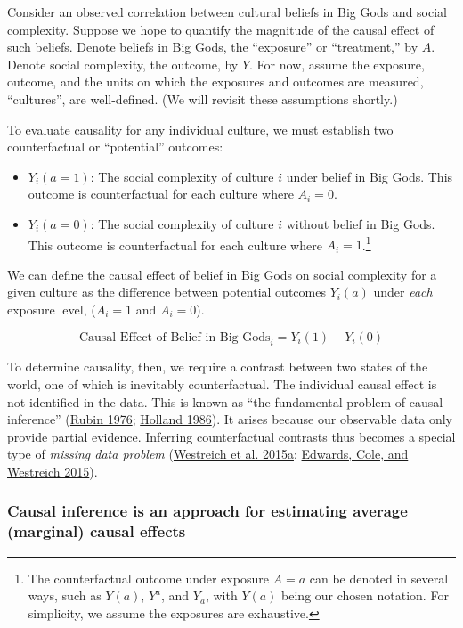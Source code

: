 \documentclass[
  singlecolumn]{report}
\providecommand{\tightlist}{%
  \setlength{\itemsep}{0pt}\setlength{\parskip}{0pt}}\usepackage{longtable,booktabs,array}
\begin{document}
Consider an observed correlation between cultural beliefs in Big Gods
and social complexity. Suppose we hope to quantify the magnitude of the
causal effect of such beliefs. Denote beliefs in Big Gods, the
``exposure'' or ``treatment,'' by \(A\). Denote social complexity, the
outcome, by \(Y\). For now, assume the exposure, outcome, and the units
on which the exposures and outcomes are measured, ``cultures'', are
well-defined. (We will revisit these assumptions shortly.)

To evaluate causality for any individual culture, we must establish two
counterfactual or ``potential'' outcomes:

\begin{itemize}
\tightlist
\item
  \(Y_i(a = 1)\): The social complexity of culture \(i\) under belief in
  Big Gods. This outcome is counterfactual for each culture where
  \(A_i = 0\).
\item
  \(Y_i(a = 0)\): The social complexity of culture \(i\) without belief
  in Big Gods. This outcome is counterfactual for each culture where
  \(A_i = 1\).\footnote{The counterfactual outcome under exposure
    \(A = a\) can be denoted in several ways, such as \(Y(a)\),
    \(Y^{a}\), and \(Y_a\), with \(Y(a)\) being our chosen notation. For
    simplicity, we assume the exposures are exhaustive.}
\end{itemize}

We can define the causal effect of belief in Big Gods on social
complexity for a given culture as the difference between potential
outcomes \(Y_i(a)\) under \emph{each} exposure level, (\(A_i = 1\) and
\(A_i = 0\)).

\[
\text{Causal Effect of Belief in Big Gods}_i = Y_i(1) - Y_i(0) 
\]

To determine causality, then, we require a contrast between two states
of the world, one of which is inevitably counterfactual. The individual
causal effect is not identified in the data. This is known as ``the
fundamental problem of causal inference''
(\protect\hyperlink{ref-rubin1976}{Rubin 1976};
\protect\hyperlink{ref-holland1986}{Holland 1986}). It arises because
our observable data only provide partial evidence. Inferring
counterfactual contrasts thus becomes a special type of \emph{missing
data problem} (\protect\hyperlink{ref-westreich2015}{Westreich et al.
2015a}; \protect\hyperlink{ref-edwards2015}{Edwards, Cole, and Westreich
2015}).

\hypertarget{causal-inference-is-an-approach-for-estimating-average-marginal-causal-effects}{%
\subsubsection{Causal inference is an approach for estimating average
(marginal) causal
effects}\label{causal-inference-is-an-approach-for-estimating-average-marginal-causal-effects}}
\end{document}
